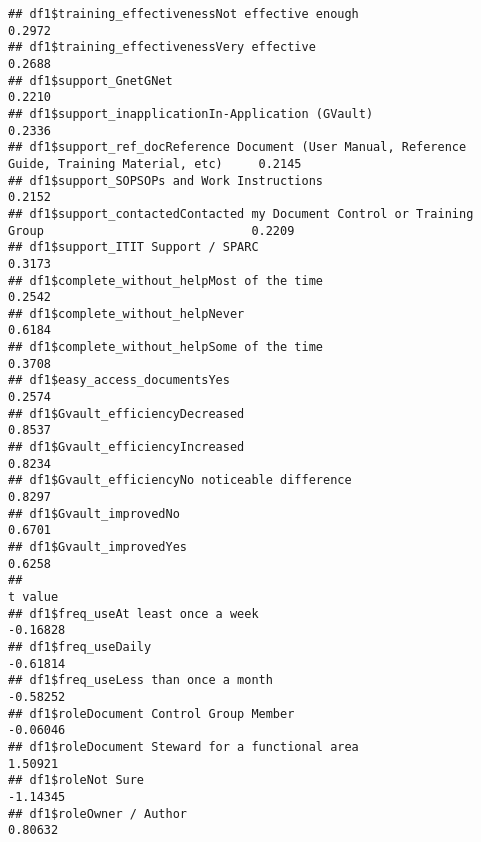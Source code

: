 \documentclass[]{article}
\begin{document}
\begin{verbatim}
## df1$training_effectivenessNot effective enough                                                   0.2972
## df1$training_effectivenessVery effective                                                         0.2688
## df1$support_GnetGNet                                                                             0.2210
## df1$support_inapplicationIn-Application (GVault)                                                 0.2336
## df1$support_ref_docReference Document (User Manual, Reference Guide, Training Material, etc)     0.2145
## df1$support_SOPSOPs and Work Instructions                                                        0.2152
## df1$support_contactedContacted my Document Control or Training Group                             0.2209
## df1$support_ITIT Support / SPARC                                                                 0.3173
## df1$complete_without_helpMost of the time                                                        0.2542
## df1$complete_without_helpNever                                                                   0.6184
## df1$complete_without_helpSome of the time                                                        0.3708
## df1$easy_access_documentsYes                                                                     0.2574
## df1$Gvault_efficiencyDecreased                                                                   0.8537
## df1$Gvault_efficiencyIncreased                                                                   0.8234
## df1$Gvault_efficiencyNo noticeable difference                                                    0.8297
## df1$Gvault_improvedNo                                                                            0.6701
## df1$Gvault_improvedYes                                                                           0.6258
##                                                                                               t value
## df1$freq_useAt least once a week                                                             -0.16828
## df1$freq_useDaily                                                                            -0.61814
## df1$freq_useLess than once a month                                                           -0.58252
## df1$roleDocument Control Group Member                                                        -0.06046
## df1$roleDocument Steward for a functional area                                                1.50921
## df1$roleNot Sure                                                                             -1.14345
## df1$roleOwner / Author                                                                        0.80632

\end{verbatim}
\end{document}
